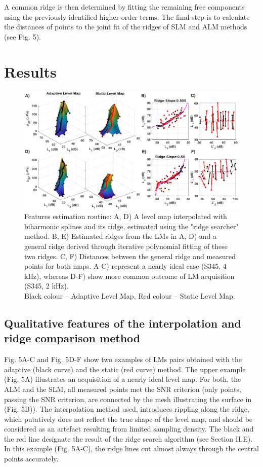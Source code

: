 \documentclass[journal,twoside,web]{ieeecolor2}
\begin{document}
A common ridge is then determined by fitting the remaining free components using the previously identified higher-order terms. The final step is to calculate the distances of points to the joint fit of the ridges of SLM and ALM methods (see Fig. 5).

\section{Results}

\begin{figure}
\includegraphics[width=\textwidth]{Fig_5_assembly2.eps} %
\caption{Features estimation routine: A, D) A level map interpolated with biharmonic splines and its ridge, estimated using the "ridge searcher" method. B, E) Estimated ridges from the LMs in A, D) and a general ridge derived through iterative polynomial fitting of these two ridges. C, F) Distances between the general ridge and measured points for both maps. A-C) represent a nearly ideal case (S345, 4 kHz), whereas D-F) show more common outcome of LM acquisition (S345, 2 kHz).\\ Black colour – Adaptive Level Map, Red colour – Static Level Map.}
\label{fig_BLK}
\end{figure}

\subsection{Qualitative features of the interpolation and ridge comparison method}
Fig. 5A-C and Fig. 5D-F show two examples of LMs pairs obtained with the adaptive (black curve) and the static (red curve) method. The upper example (Fig. 5A) illustrates an acquisition of a nearly ideal level map. For both, the ALM and the SLM, all measured points met the SNR criterion (only points, passing the SNR criterion, are connected by the mesh illustrating the surface in (Fig. 5B)). The interpolation method used, introduces rippling along the ridge, which putatively does not reflect the true shape of the level map, and should be considered as an artefact resulting from limited sampling density. The black and the red line designate the result of the ridge search algorithm (see Section II.E). In this example (Fig. 5A-C), the ridge lines cut almost always through the central points accurately. 
\end{document}
